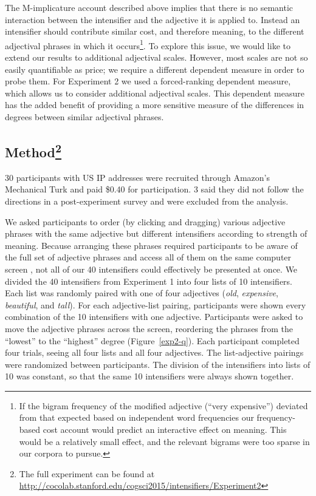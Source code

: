 \documentclass[10pt,letterpaper]{article}
\newcommand{\w}[1]{\emph{#1}}
\begin{document}
The M-implicature account described above implies that there is no semantic interaction between the intensifier and the adjective it is applied to. Instead an intensifier should contribute similar cost, and therefore meaning, to the different adjectival phrases in which it occurs\footnote{If the bigram frequency of the modified adjective (``very expensive'') deviated from that expected based on independent word frequencies our frequency-based cost account would predict an interactive effect on meaning. This would be a relatively small effect, and the relevant bigrams were too sparse in our corpora to pursue.}.
To explore this issue, we would like to extend our results to additional adjectival scales. However, most scales are not so easily quantifiable as price; we require a different dependent measure in order to probe them.
For Experiment 2 we used a forced-ranking dependent measure, which allows us to consider additional adjectival scales. This dependent measure has the added benefit of providing a more sensitive measure of the differences in degrees between similar adjectival phrases.

\subsection{Method\footnote{The full experiment can be found at \url{http://cocolab.stanford.edu/cogsci2015/intensifiers/Experiment2}}}

30 participants with US IP addresses were recruited through Amazon's Mechanical Turk and paid \$0.40 for participation. 3 said they did not follow the directions in a post-experiment survey and were excluded from the analysis.

We asked participants to order (by clicking and dragging) various adjective phrases with the same adjective but different intensifiers according to strength of meaning. Because arranging these phrases required participants to be aware of the full set of adjective phrases and access all of them on the same computer screen%
, not all of our 40 intensifiers could effectively be presented at once. We divided the 40 intensifiers from Experiment 1 into four lists of 10 intensifiers. 
Each list was randomly paired with one of four adjectives (\w{old}, \w{expensive}, \w{beautiful}, and \w{tall}).
For each adjective-list pairing, participants were shown every combination of the 10 intensifiers with one adjective.
Participants were asked to move the adjective phrases %
across 
the screen, reordering the phrases from the ``lowest'' to the ``highest'' degree (Figure~\ref{exp2-q}).
Each participant completed four trials, seeing all four lists and all four adjectives.
The list-adjective pairings were randomized between participants.%
The division of the intensifiers into lists of 10
was constant, so that the same 10 intensifiers were always shown together.%
\end{document}
